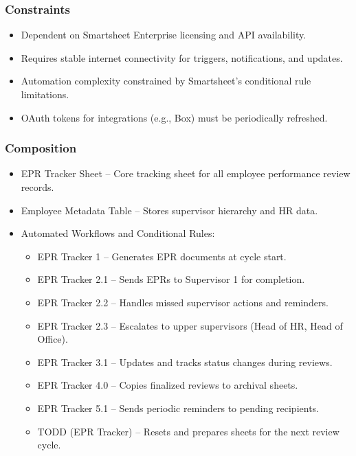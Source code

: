\documentclass[12pt]{article}
\def\textbf#1{#1}%
\begin{document}
\subsubsection{Constraints}
\begin{itemize}[nosep]
  \item Dependent on Smartsheet Enterprise licensing and API availability.
  \item Requires stable internet connectivity for triggers, notifications, and updates.
  \item Automation complexity constrained by Smartsheet’s conditional rule limitations.
  \item OAuth tokens for integrations (e.g., Box) must be periodically refreshed.
\end{itemize}

\subsubsection{Composition}

\begin{itemize}[nosep]
  \item \textbf{EPR Tracker Sheet} – Core tracking sheet for all employee performance review records.
  \item \textbf{Employee Metadata Table} – Stores supervisor hierarchy and HR data.
  \item \textbf{Automated Workflows and Conditional Rules:}
  \begin{itemize}[nosep]
    \item EPR Tracker 1 – Generates EPR documents at cycle start.
    \item EPR Tracker 2.1 – Sends EPRs to Supervisor 1 for completion.
    \item EPR Tracker 2.2 – Handles missed supervisor actions and reminders.
    \item EPR Tracker 2.3 – Escalates to upper supervisors (Head of HR, Head of Office).
    \item EPR Tracker 3.1 – Updates and tracks status changes during reviews.
    \item EPR Tracker 4.0 – Copies finalized reviews to archival sheets.
    \item EPR Tracker 5.1 – Sends periodic reminders to pending recipients.
    \item TODD (EPR Tracker) – Resets and prepares sheets for the next review cycle.
  \end{itemize}
\end{itemize}
\end{document}
